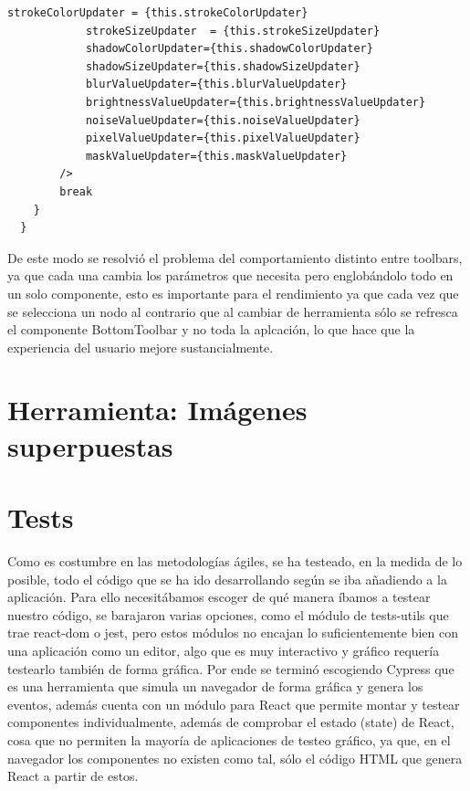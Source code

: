 \begin{lstlisting}[caption={Switch del componente BottomToolbar principal que devuelve la BottomToolbar según el estado.}]
            strokeColorUpdater = {this.strokeColorUpdater}
            strokeSizeUpdater  = {this.strokeSizeUpdater}
            shadowColorUpdater={this.shadowColorUpdater}
            shadowSizeUpdater={this.shadowSizeUpdater}
            blurValueUpdater={this.blurValueUpdater}
            brightnessValueUpdater={this.brightnessValueUpdater}
            noiseValueUpdater={this.noiseValueUpdater}
            pixelValueUpdater={this.pixelValueUpdater}
            maskValueUpdater={this.maskValueUpdater}
        />
        break
    }
  }
\end{lstlisting}

De este modo se resolvió el problema del comportamiento distinto entre toolbars, ya que cada
una cambia los parámetros que necesita pero englobándolo todo en un solo componente, esto es 
importante para el rendimiento ya que cada vez que se selecciona un nodo al contrario que al
cambiar de herramienta sólo se refresca el componente BottomToolbar y no toda la aplcación,
lo que hace que la experiencia del usuario mejore sustancialmente.

\section{Herramienta: Imágenes superpuestas}

\newpage
\section{Tests}

Como es costumbre en las metodologías ágiles, se ha testeado, en la medida de lo posible,
todo el código que se ha ido desarrollando según se iba añadiendo a la aplicación.
Para ello necesitábamos escoger de qué manera íbamos a testear nuestro código, se barajaron
varias opciones, como el módulo de tests-utils que trae react-dom \cite{react-dom} o jest, 
pero estos módulos no encajan lo suficientemente bien con una aplicación como un editor, 
algo que es muy interactivo y gráfico requería testearlo también de forma gráfica. Por ende
se terminó escogiendo Cypress \cite{cypress} que es una herramienta que simula un navegador de
forma gráfica y genera los eventos, además cuenta con un módulo para React \cite{cypressReact} que permite montar
y testear componentes individualmente, además de comprobar el estado (state) de React, cosa
que no permiten la mayoría de aplicaciones de testeo gráfico, ya que, en el navegador los
componentes no existen como tal, sólo el código HTML que genera React a partir de estos.

